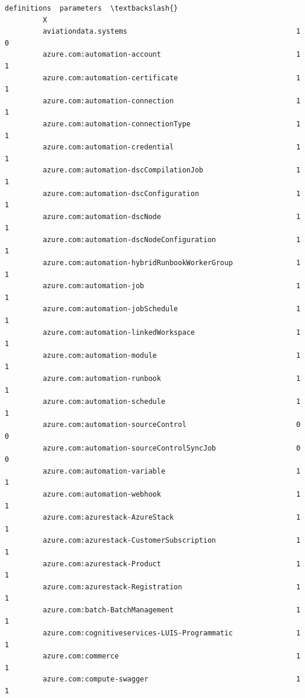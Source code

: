 \documentclass[11pt]{article}
\begin{document}
\begin{Verbatim}[commandchars=\\\{\}]
                                                           definitions  parameters  \textbackslash{}
         X                                                                           
         aviationdata.systems                                        1           0   
         azure.com:automation-account                                1           1   
         azure.com:automation-certificate                            1           1   
         azure.com:automation-connection                             1           1   
         azure.com:automation-connectionType                         1           1   
         azure.com:automation-credential                             1           1   
         azure.com:automation-dscCompilationJob                      1           1   
         azure.com:automation-dscConfiguration                       1           1   
         azure.com:automation-dscNode                                1           1   
         azure.com:automation-dscNodeConfiguration                   1           1   
         azure.com:automation-hybridRunbookWorkerGroup               1           1   
         azure.com:automation-job                                    1           1   
         azure.com:automation-jobSchedule                            1           1   
         azure.com:automation-linkedWorkspace                        1           1   
         azure.com:automation-module                                 1           1   
         azure.com:automation-runbook                                1           1   
         azure.com:automation-schedule                               1           1   
         azure.com:automation-sourceControl                          0           0   
         azure.com:automation-sourceControlSyncJob                   0           0   
         azure.com:automation-variable                               1           1   
         azure.com:automation-webhook                                1           1   
         azure.com:azurestack-AzureStack                             1           1   
         azure.com:azurestack-CustomerSubscription                   1           1   
         azure.com:azurestack-Product                                1           1   
         azure.com:azurestack-Registration                           1           1   
         azure.com:batch-BatchManagement                             1           1   
         azure.com:cognitiveservices-LUIS-Programmatic               1           1   
         azure.com:commerce                                          1           1   
         azure.com:compute-swagger                                   1           1   

\end{Verbatim}
\end{document}
